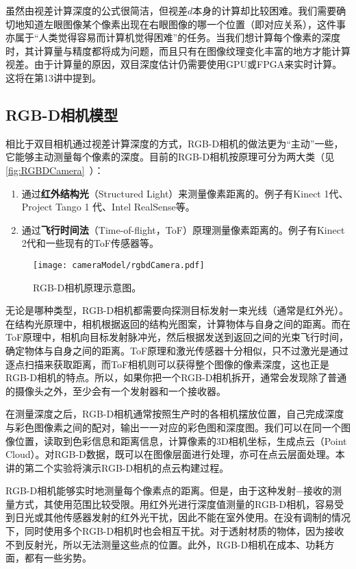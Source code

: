 虽然由视差计算深度的公式很简洁，但视差$d$本身的计算却比较困难。我们需要确切地知道左眼图像某个像素出现在右眼图像的哪一个位置（即对应关系），这件事亦属于“人类觉得容易而计算机觉得困难”的任务。当我们想计算每个像素的深度时，其计算量与精度都将成为问题，而且只有在图像纹理变化丰富的地方才能计算视差。由于计算量的原因，双目深度估计仍需要使用GPU或FPGA来实时计算。这将在第13讲中提到。

\subsection{RGB-D相机模型}
相比于双目相机通过视差计算深度的方式，RGB-D相机的做法更为“主动”一些，它能够主动测量每个像素的深度。目前的RGB-D相机按原理可分为两大类（见\autoref{fig:RGBDCamera}~）：

\begin{enumerate}
	\item 通过\textbf{红外结构光}（Structured Light）来测量像素距离的。例子有Kinect 1代、Project Tango 1 代、Intel RealSense等。
	\item 通过\textbf{飞行时间法}（Time-of-flight，ToF）原理测量像素距离的。例子有Kinect 2代和一些现有的ToF传感器等。
\end{enumerate}

\begin{figure}[!ht]
	\centering
	\texttt{[image: cameraModel/rgbdCamera.pdf]}
	\caption{RGB-D相机原理示意图。}
	\label{fig:RGBDCamera}
\end{figure}

无论是哪种类型，RGB-D相机都需要向探测目标发射一束光线（通常是红外光）。在结构光原理中，相机根据返回的结构光图案，计算物体与自身之间的距离。而在ToF原理中，相机向目标发射脉冲光，然后根据发送到返回之间的光束飞行时间，确定物体与自身之间的距离。ToF原理和激光传感器十分相似，只不过激光是通过逐点扫描来获取距离，而ToF相机则可以获得整个图像的像素深度，这也正是RGB-D相机的特点。所以，如果你把一个RGB-D相机拆开，通常会发现除了普通的摄像头之外，至少会有一个发射器和一个接收器。

在测量深度之后，RGB-D相机通常按照生产时的各相机摆放位置，自己完成深度与彩色图像素之间的配对，输出一一对应的彩色图和深度图。我们可以在同一个图像位置，读取到色彩信息和距离信息，计算像素的3D相机坐标，生成点云（Point Cloud）。对RGB-D数据，既可以在图像层面进行处理，亦可在点云层面处理。本讲的第二个实验将演示RGB-D相机的点云构建过程。

RGB-D相机能够实时地测量每个像素点的距离。但是，由于这种发射−接收的测量方式，其使用范围比较受限。用红外光进行深度值测量的RGB-D相机，容易受到日光或其他传感器发射的红外光干扰，因此不能在室外使用。在没有调制的情况下，同时使用多个RGB-D相机时也会相互干扰。对于透射材质的物体，因为接收不到反射光，所以无法测量这些点的位置。此外，RGB-D相机在成本、功耗方面，都有一些劣势。

